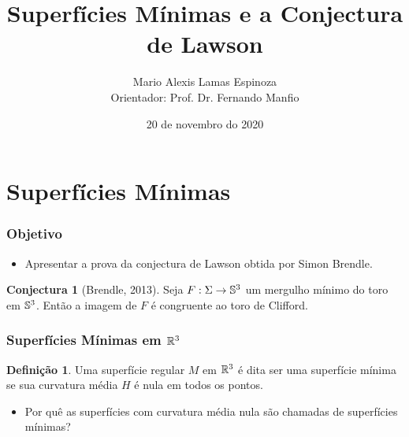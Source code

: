 \documentclass[10pt,a4paper]{beamer}
\author[Mario Lamas, Orientador: Dr. F. Manfio]{Mario Alexis Lamas Espinoza \\ Orientador: Prof. Dr. Fernando Manfio}
\title{Superfícies Mínimas e a Conjectura de Lawson}
\institute[ICMC]{Instituto de Ciências Matemáticas e de Computação}
\date{20 de novembro do 2020}
\theoremstyle{definition}
\newtheorem{definicao}{Definição}
\newtheorem{conjectura}{Conjectura}
\begin{document}
\begin{frame}
	\maketitle	
\end{frame}

\section{Superfícies Mínimas}

\begin{frame}
	\frametitle{Objetivo}
	
	\begin{itemize}
		\item Apresentar a prova da conjectura de Lawson obtida por Simon Brendle.
	\end{itemize}

	\pause
	\vspace{1cm}

	\begin{conjectura}[Brendle, 2013]
		Seja $F: \Sigma \rightarrow \mathbb{S}^3$ um mergulho mínimo do toro em $\mathbb{S}^3$. Então a imagem de $F$ é congruente ao toro de Clifford.
	\end{conjectura}
\end{frame}

\begin{frame}
	\frametitle{Superfícies Mínimas em $\mathbb R^3$}
	
	\begin{definicao}
		Uma superfície regular $M$ em $\mathbb R^3$ é dita ser uma  \alert{superfície mínima} se sua curvatura
		média $H$ é nula em todos os pontos.
	\end{definicao}

	\pause
	
	\begin{itemize}
		\item Por quê as superfícies com curvatura média nula são chamadas de superfícies mínimas?
	\end{itemize}

\end{frame}
\end{document}
